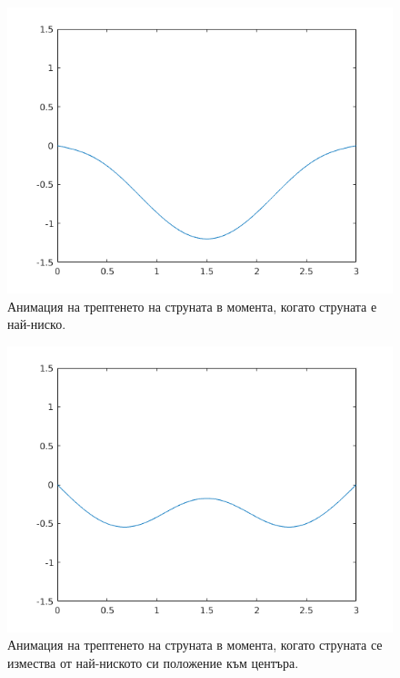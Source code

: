 \documentclass[14pt]{extarticle}
\begin{document}
\begin{figure}[H]
	\captionsetup{justification=centering,margin=2cm}
	\centering
	\includegraphics[scale=0.8]{images/task21down}
	\caption{Анимация на трептенето на струната в момента, когато струната е най-ниско.}
\end{figure}

\begin{figure}[H]
	\captionsetup{justification=centering,margin=2cm}
	\centering
	\includegraphics[scale=0.8]{images/task21downMid}
	\caption{Анимация на трептенето на струната в момента, когато струната се измества от най-ниското си положение към центъра.}
\end{figure}
\end{document}
